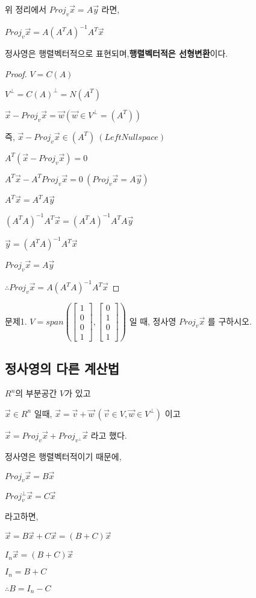 \begin{theorem}
위 정리에서 $Proj_v\vec{x} = A\vec{y}$ 라면,

$Proj_v\vec{x} = A(A^{T}A)^{-1}A^{T}\vec{x}$

정사영은 행렬벡터적으로 표현되며,\textbf{행렬벡터적은 선형변환}이다.
\end{theorem}

\begin{proof}

$V = C(A)$

$V^{\perp} = C(A)^{\perp} = N(A^{T})$

$\vec{x} - Proj_v\vec{x} = \vec{w} (\vec{w} \in V^{\perp} = (A^{T}))$

즉, $\vec{x} - Proj_v\vec{x} \in (A^{T}) \ (Left Nullspace)$

$A^{T}(\vec{x} - Proj_v\vec{x}) = 0$

$A^{T}\vec{x} - A^{T}Proj_v\vec{x} = 0 \ (Proj_v\vec{x} = A\vec{y})$

$A^{T}\vec{x} = A^{T}A\vec{y}$

$(A^{T}A)^{-1}A^{T}\vec{x} = (A^{T}A)^{-1}A^{T}A\vec{y}$

$\vec{y} = (A^{T}A)^{-1}A^{T}\vec{x}$

$Proj_v\vec{x} = A\vec{y}$

$\therefore Proj_v\vec{x} = A(A^{T}A)^{-1}A^{T}\vec{x}$
\end{proof}

\newpage
문제1. $V = span(\begin{bmatrix}1 \\ 0 \\ 0 \\ 1\end{bmatrix}, \begin{bmatrix}0 \\ 1 \\ 0 \\ 1\end{bmatrix})$ 일 때, 정사영 $Proj_v \vec{x}$ 를 구하시오.

\newpage
\subsection{정사영의 다른 계산법}

\begin{lemma}
$R^n$의 부분공간 $V$가 있고

$\vec{x} \in R^n$ 일때, $\vec{x} = \vec{v} + \vec{w} \ (\vec{v} \in V, \vec{w} \in V^{\perp})$ 이고 

$\vec{x} = Proj_v\vec{x} + Proj_{v^{\perp}}\vec{x}$ 라고 했다.

정사영은 행렬벡터적이기 때문에, 

$Proj_v\vec{x} = B\vec{x}$

$Proj_v^{\perp}\vec{x} = C\vec{x}$

라고하면,

$\vec{x} = B\vec{x} + C\vec{x} = (B + C)\vec{x}$

$I_n\vec{x} = (B + C)\vec{x}$

$I_n = B+C$

$\therefore B = I_n - C $
\end{lemma}



